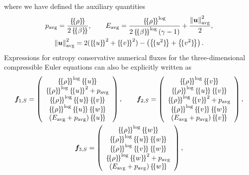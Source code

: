 \documentclass[review,onefignum,onetabnum,final]{siamart171218}
\newcommand{\nor}[1]{\left\| #1 \right\|}
\newcommand{\LRp}[1]{\left( #1 \right)}
\newcommand{\LRc}[1]{\left\{ #1 \right\}}
\newcommand{\avg}[1] {\ensuremath{\LRc{\!\{#1\}\!}}}
\begin{document}
where we have defined the auxiliary quantities 
\begin{gather}
p_{\rm avg} = \frac{\avg{\rho}}{2\avg{\beta}}, \qquad E_{\rm avg} = \frac{\avg{\rho}^{\log}}{2\avg{\beta}^{\log}\LRp{\gamma -1}}   + \frac{\nor{\bm{u}}^2_{\rm avg}}{2}, \label{eq:fluxaux} \\
 \nor{\bm{u}}^2_{\rm avg} = 2(\avg{u}^2 + \avg{v}^2) - \LRp{\avg{u^2} +\avg{v^2}} \nonumber.  
\end{gather}
Expressions for entropy conservative numerical fluxes for the three-dimensional compressible Euler equations can also be explicitly written as
\begin{gather*}
\bm{f}_{1,S} = \LRp{\begin{array}{c}
\avg{\rho}^{\log}\avg{u}\\
\avg{\rho}^{\log}\avg{u}^2 + p_{\rm avg}\\
\avg{\rho}^{\log}\avg{u}\avg{v}\\
\avg{\rho}^{\log}\avg{u}\avg{w}\\
(E_{\rm avg}+ p_{\rm avg})\avg{u}\\
\end{array}}, 
\qquad 
\bm{f}_{2,S} = \LRp{\begin{array}{c}
\avg{\rho}^{\log}\avg{v}\\
\avg{\rho}^{\log}\avg{u}\avg{v}\\
\avg{\rho}^{\log}\avg{v}^2 + p_{\rm avg}\\
\avg{\rho}^{\log}\avg{v}\avg{w}\\
(E_{\rm avg}+ p_{\rm avg})\avg{v}\\
\end{array}},\\
\bm{f}_{3,S} = \LRp{\begin{array}{c}
\avg{\rho}^{\log}\avg{w}\\
\avg{\rho}^{\log}\avg{u}\avg{w}\\
\avg{\rho}^{\log}\avg{v}\avg{w}\\
\avg{\rho}^{\log}\avg{w}^2 + p_{\rm avg}\\
(E_{\rm avg}+ p_{\rm avg})\avg{w}\\
\end{array}},\nonumber
\end{gather*}
\end{document}
